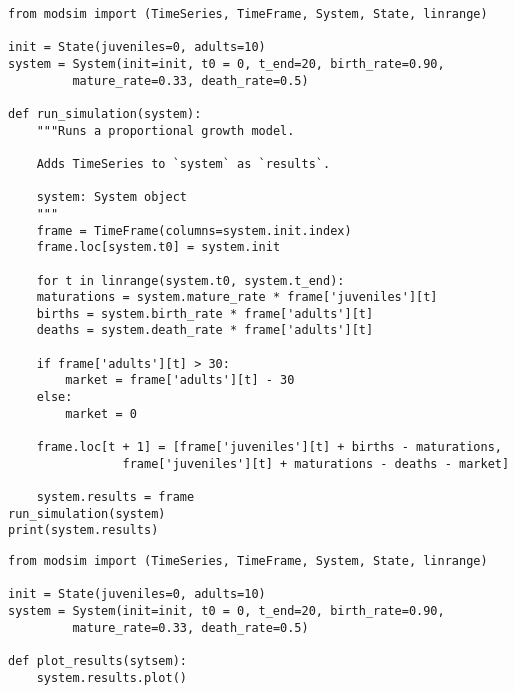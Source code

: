 \documentclass[11pt]{article}
\begin{document}
\begin{verbatim}
from modsim import (TimeSeries, TimeFrame, System, State, linrange)

init = State(juveniles=0, adults=10)
system = System(init=init, t0 = 0, t_end=20, birth_rate=0.90,
		 mature_rate=0.33, death_rate=0.5)

def run_simulation(system):
    """Runs a proportional growth model.

    Adds TimeSeries to `system` as `results`.

    system: System object
    """
    frame = TimeFrame(columns=system.init.index)
    frame.loc[system.t0] = system.init

    for t in linrange(system.t0, system.t_end):
	maturations = system.mature_rate * frame['juveniles'][t]
	births = system.birth_rate * frame['adults'][t]
	deaths = system.death_rate * frame['adults'][t]

	if frame['adults'][t] > 30:
	    market = frame['adults'][t] - 30
	else:
	    market = 0

	frame.loc[t + 1] = [frame['juveniles'][t] + births - maturations,
			    frame['juveniles'][t] + maturations - deaths - market]

    system.results = frame
run_simulation(system)
print(system.results)
\end{verbatim}

\begin{verbatim}
from modsim import (TimeSeries, TimeFrame, System, State, linrange)

init = State(juveniles=0, adults=10)
system = System(init=init, t0 = 0, t_end=20, birth_rate=0.90,
		 mature_rate=0.33, death_rate=0.5)

def plot_results(sytsem):
    system.results.plot()
\end{verbatim}
\end{document}
